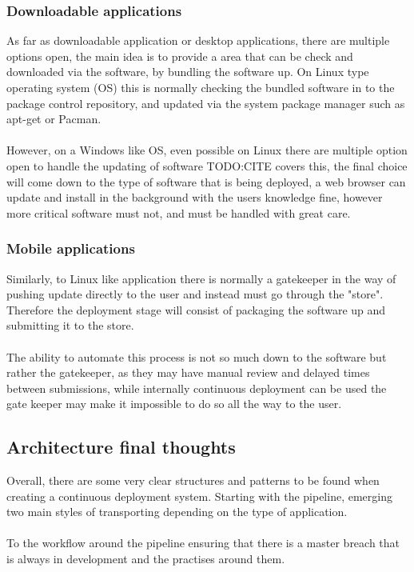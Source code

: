 \subsubsection{Downloadable applications}

As far as downloadable application or desktop applications, there are multiple options open, the main idea is to provide a area that can be check and downloaded via the software, by bundling the software up. On Linux type operating system (OS) this is normally checking the bundled software in to the package control repository, and updated via the system package manager such as apt-get or Pacman. 
\\\\
However, on a Windows like OS, even possible on Linux there are multiple option open to handle the updating of software TODO:CITE covers this, the final choice will come down to the type of software that is being deployed, a web browser can update and install in the background with the users knowledge fine, however more critical software must not, and must be handled with great care.

\subsubsection{Mobile applications}

Similarly, to Linux like application there is normally a gatekeeper in the way of pushing update directly to the user and instead must go through the "store". Therefore the deployment stage will consist of packaging the software up and submitting it to the store. 
\\\\
The ability to automate this process is not so much down to the software but rather the gatekeeper, as they may have manual review and delayed times between submissions, while internally continuous deployment can be used the gate keeper may make it impossible to do so all the way to the user.

\subsection{Architecture final thoughts}

Overall, there are some very clear structures and patterns to be found when creating a continuous deployment system. Starting with the pipeline, emerging two main styles of transporting depending on the type of application.
\\\\
To the workflow around the pipeline ensuring that there is a master breach that is always in development and the practises around them. 